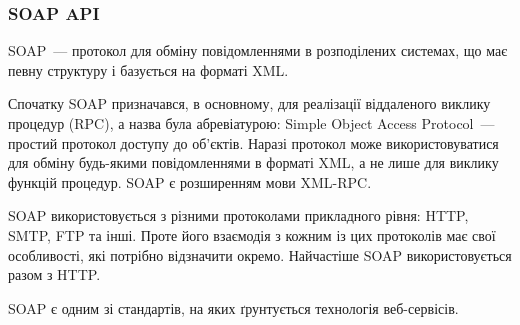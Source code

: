 \subsubsection{SOAP API}

SOAP~--- протокол для обміну повідомленнями в розподілених системах, що має певну структуру і базується на форматі XML.

Спочатку SOAP призначався, в основному, для реалізації віддаленого виклику процедур (RPC), а назва була абревіатурою: Simple Object Access Protocol~--- простий протокол доступу до об'єктів. Наразі протокол може використовуватися для обміну будь-якими повідомленнями в форматі XML, а не лише для виклику функцій процедур. SOAP є розширенням мови XML-RPC.

SOAP використовується з різними протоколами прикладного рівня: HTTP, SMTP, FTP та інші. Проте його взаємодія з кожним із цих протоколів має свої особливості, які потрібно відзначити окремо. Найчастіше SOAP використовується разом з HTTP.

SOAP є одним зі стандартів, на яких ґрунтується технологія веб-сервісів.
